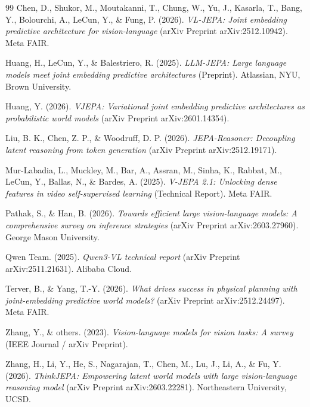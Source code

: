 \begin{thebibliography}{99}
Chen, D., Shukor, M., Moutakanni, T., Chung, W., Yu, J., Kasarla, T., Bang, Y., Bolourchi, A., LeCun, Y., \& Fung, P. (2026). \textit{VL-JEPA: Joint embedding predictive architecture for vision-language} (arXiv Preprint arXiv:2512.10942). Meta FAIR.

Huang, H., LeCun, Y., \& Balestriero, R. (2025). \textit{LLM-JEPA: Large language models meet joint embedding predictive architectures} (Preprint). Atlassian, NYU, Brown University.

Huang, Y. (2026). \textit{VJEPA: Variational joint embedding predictive architectures as probabilistic world models} (arXiv Preprint arXiv:2601.14354).

Liu, B. K., Chen, Z. P., \& Woodruff, D. P. (2026). \textit{JEPA-Reasoner: Decoupling latent reasoning from token generation} (arXiv Preprint arXiv:2512.19171).

Mur-Labadia, L., Muckley, M., Bar, A., Assran, M., Sinha, K., Rabbat, M., LeCun, Y., Ballas, N., \& Bardes, A. (2025). \textit{V-JEPA 2.1: Unlocking dense features in video self-supervised learning} (Technical Report). Meta FAIR.

Pathak, S., \& Han, B. (2026). \textit{Towards efficient large vision-language models: A comprehensive survey on inference strategies} (arXiv Preprint arXiv:2603.27960). George Mason University.

Qwen Team. (2025). \textit{Qwen3-VL technical report} (arXiv Preprint arXiv:2511.21631). Alibaba Cloud.

Terver, B., \& Yang, T.-Y. (2026). \textit{What drives success in physical planning with joint-embedding predictive world models?} (arXiv Preprint arXiv:2512.24497). Meta FAIR.

Zhang, Y., \& others. (2023). \textit{Vision-language models for vision tasks: A survey} (IEEE Journal / arXiv Preprint).

Zhang, H., Li, Y., He, S., Nagarajan, T., Chen, M., Lu, J., Li, A., \& Fu, Y. (2026). \textit{ThinkJEPA: Empowering latent world models with large vision-language reasoning model} (arXiv Preprint arXiv:2603.22281). Northeastern University, UCSD.

\end{thebibliography}
